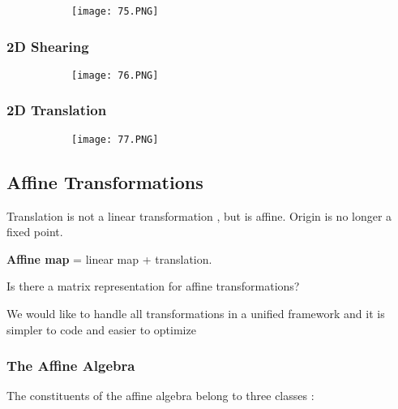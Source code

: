 \documentclass{article}
\begin{document}
\begin{figure}[ht!]
  \centering
  \begin{subfigure}[b]{0.6\linewidth}
    \texttt{[image: 75.PNG]}
  \end{subfigure}
\end{figure} 

\vspace{20mm}
\subsubsection{2D Shearing}

\begin{figure}[ht!]
  \centering
  \begin{subfigure}[b]{0.4\linewidth}
    \texttt{[image: 76.PNG]}
  \end{subfigure}
\end{figure} 

\subsubsection{2D Translation}

\begin{figure}[ht!]
  \centering
  \begin{subfigure}[b]{0.4\linewidth}
    \texttt{[image: 77.PNG]}
  \end{subfigure}
\end{figure} 


\subsection{Affine Transformations}

Translation is not a linear transformation , but is affine.
Origin is no longer a fixed point.

\textbf{Affine map } = linear map + translation.

Is there a matrix representation for affine transformations?

We would like to handle all transformations in a unified framework and it is simpler to code and easier to optimize

\subsubsection{The Affine Algebra}

The constituents of the affine algebra belong to three classes : 
\end{document}
